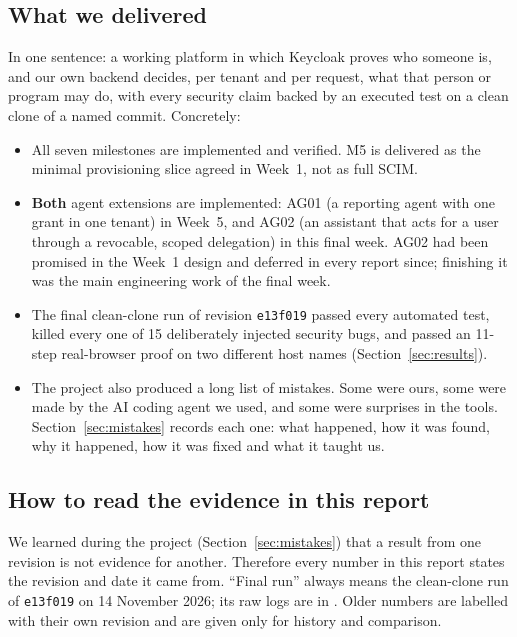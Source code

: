 \subsection{What we delivered}
In one sentence: a working platform in which Keycloak proves who someone is, and our own backend decides, per tenant and per request, what that person or program may do, with every security claim backed by an executed test on a clean clone of a named commit. Concretely:
\begin{itemize}
  \item All seven milestones are implemented and verified. M5 is delivered as the minimal provisioning slice agreed in Week~1, not as full SCIM.
  \item \textbf{Both} agent extensions are implemented: AG01 (a reporting agent with one grant in one tenant) in Week~5, and AG02 (an assistant that acts for a user through a revocable, scoped delegation) in this final week. AG02 had been promised in the Week~1 design and deferred in every report since; finishing it was the main engineering work of the final week.
  \item The final clean-clone run of revision \texttt{e13f019} passed every automated test, killed every one of 15 deliberately injected security bugs, and passed an 11-step real-browser proof on two different host names (Section~\ref{sec:results}).
  \item The project also produced a long list of mistakes. Some were ours, some were made by the AI coding agent we used, and some were surprises in the tools. Section~\ref{sec:mistakes} records each one: what happened, how it was found, why it happened, how it was fixed and what it taught us.
\end{itemize}

\subsection{How to read the evidence in this report}
We learned during the project (Section~\ref{sec:mistakes}) that a result from one revision is not evidence for another. Therefore every number in this report states the revision and date it came from. ``Final run'' always means the clean-clone run of \texttt{e13f019} on 14 November 2026; its raw logs are in . Older numbers are labelled with their own revision and are given only for history and comparison.

